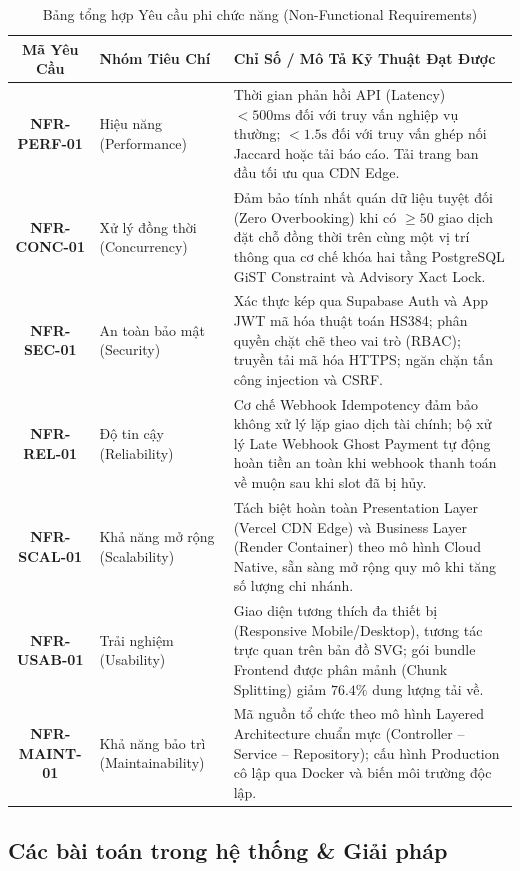 \begin{table}[H]
\centering
\caption{Bảng tổng hợp Yêu cầu phi chức năng (Non-Functional Requirements)}
\label{tab:non-functional-requirements}
\renewcommand{\arraystretch}{1.3}
\begin{tabular}{|c|l|p{8cm}|}
\hline
\textbf{Mã Yêu Cầu} & \textbf{Nhóm Tiêu Chí} & \textbf{Chỉ Số / Mô Tả Kỹ Thuật Đạt Được} \\
\hline
\textbf{NFR-PERF-01} & Hiệu năng (Performance) & Thời gian phản hồi API (Latency) $< 500\text{ms}$ đối với truy vấn nghiệp vụ thường; $< 1.5\text{s}$ đối với truy vấn ghép nối Jaccard hoặc tải báo cáo. Tải trang ban đầu tối ưu qua CDN Edge. \\
\hline
\textbf{NFR-CONC-01} & Xử lý đồng thời (Concurrency) & Đảm bảo tính nhất quán dữ liệu tuyệt đối (Zero Overbooking) khi có $\ge 50$ giao dịch đặt chỗ đồng thời trên cùng một vị trí thông qua cơ chế khóa hai tầng PostgreSQL GiST Constraint và Advisory Xact Lock. \\
\hline
\textbf{NFR-SEC-01} & An toàn bảo mật (Security) & Xác thực kép qua Supabase Auth và App JWT mã hóa thuật toán HS384; phân quyền chặt chẽ theo vai trò (RBAC); truyền tải mã hóa HTTPS; ngăn chặn tấn công injection và CSRF. \\
\hline
\textbf{NFR-REL-01} & Độ tin cậy (Reliability) & Cơ chế Webhook Idempotency đảm bảo không xử lý lặp giao dịch tài chính; bộ xử lý Late Webhook Ghost Payment tự động hoàn tiền an toàn khi webhook thanh toán về muộn sau khi slot đã bị hủy. \\
\hline
\textbf{NFR-SCAL-01} & Khả năng mở rộng (Scalability) & Tách biệt hoàn toàn Presentation Layer (Vercel CDN Edge) và Business Layer (Render Container) theo mô hình Cloud Native, sẵn sàng mở rộng quy mô khi tăng số lượng chi nhánh. \\
\hline
\textbf{NFR-USAB-01} & Trải nghiệm (Usability) & Giao diện tương thích đa thiết bị (Responsive Mobile/Desktop), tương tác trực quan trên bản đồ SVG; gói bundle Frontend được phân mảnh (Chunk Splitting) giảm $76.4\%$ dung lượng tải về. \\
\hline
\textbf{NFR-MAINT-01} & Khả năng bảo trì (Maintainability) & Mã nguồn tổ chức theo mô hình Layered Architecture chuẩn mực (Controller -- Service -- Repository); cấu hình Production cô lập qua Docker và biến môi trường độc lập. \\
\hline
\end{tabular}
\end{table}

\subsection{Các bài toán trong hệ thống \& Giải pháp}

